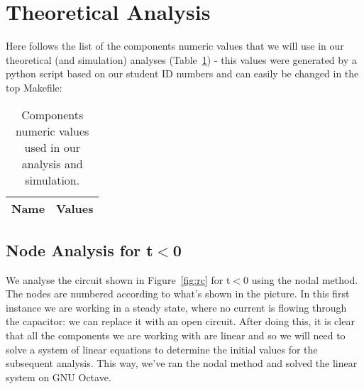 \section{Theoretical Analysis}
\label{sec:analysis}

Here follows the list of the components numeric values that we will use in our theoretical (and simulation) analyses (Table~\ref{tab:python}) - this values were generated by a python script based on our student ID numbers and can easily be changed in the top Makefile:

\begin{table}[h]
  \centering
  \begin{tabular}{|l|r|}
    \hline    
    {\bf Name} & {\bf Values} \\ \hline
     
  \end{tabular}
  \caption{Components numeric values used in our analysis and simulation.}
  \label{tab:python}
\end{table}

\subsection{Node Analysis for t$<$0}

We analyse the circuit shown in Figure~\ref{fig:rc} for t$<$0 using the nodal method.
The nodes are numbered according to what's shown in the picture.
In this first instance we are working in a steady state, where no current is flowing through the capacitor: we can replace it with an open circuit.
After doing this, it is clear that all the components we are working with are linear and so we will need to solve a system of linear equations to determine the initial values for the subsequent analysis.
This way, we’ve ran the nodal method and solved the linear system on GNU Octave.

